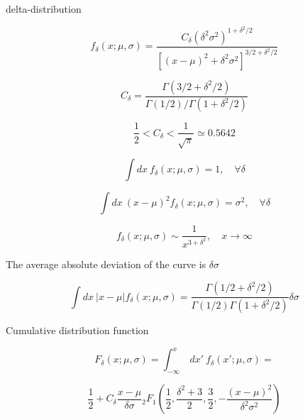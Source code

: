\documentclass[]{slides}
\begin{document}
delta-distribution

$$
f_\delta(x;\mu,\sigma) = 
\frac{C_\delta(\delta^2\sigma^2)^{1+\delta^2/2}}
{[(x-\mu)^2+\delta^2\sigma^2]^{3/2+\delta^2/2}}
$$

$$
C_\delta = \frac{\Gamma(3/2+\delta^2/2)}{\Gamma(1/2)/\Gamma(1+\delta^2/2)}
$$

$$\frac12 < C_\delta < \frac1{\sqrt\pi}\simeq 0.5642$$

$$
\int dx\ f_\delta(x;\mu,\sigma) = 1,\quad \forall \delta
$$

$$
\int dx\ (x-\mu)^2f_\delta(x;\mu,\sigma) = \sigma^2,\quad \forall \delta
$$

$$
f_\delta(x;\mu,\sigma) \sim \frac1{x^{3+\delta^2}},\quad x\to\infty
$$

The average absolute deviation of the curve is $\delta\sigma$

$$
\int dx\ |x-\mu|f_\delta(x;\mu,\sigma) = 
\frac{\Gamma(1/2+\delta^2/2)}{\Gamma(1/2)\Gamma(1+\delta^2/2)}\delta\sigma
$$

Cumulative distribution function

$$
F_\delta(x;\mu,\sigma) = \int_{-\infty}^x\ dx'\ f_\delta(x';\mu,\sigma) =
$$

$$
\frac12 + C_\delta\frac{x-\mu}{\delta\sigma}
{}_2F_1\left(\frac12, \frac{\delta^2+3}2, \frac32, -\frac{(x-\mu)^2}
{\delta^2\sigma^2}\right)
$$
\end{document}
